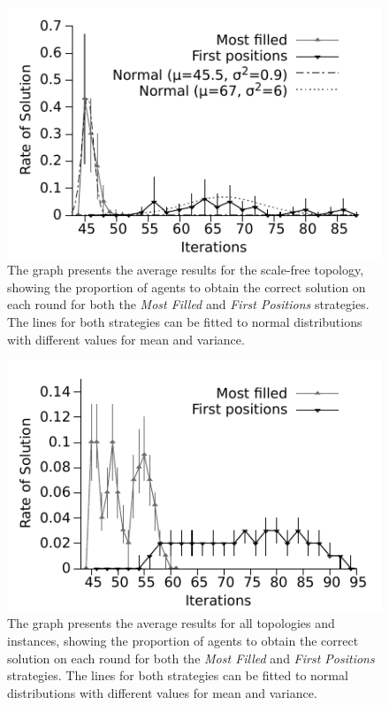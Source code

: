 \documentclass{article}
\begin{document}
\begin{figure}
\includegraphics[scale=1]{ijcai_sudoku/sf}
\caption{The graph presents the average results for the scale-free topology, showing the proportion of agents to obtain the correct solution on each round for both the \emph{Most Filled} and \emph{First Positions} strategies. The lines for both strategies can be fitted to normal distributions with different values for mean and variance.}
\label{fig:sf_gauss}
\end{figure}

\begin{figure}
\includegraphics[scale=1]{ijcai_sudoku/geral}
\caption{The graph presents the average results for all topologies and instances, showing the proportion of agents to obtain the correct solution on each round for both the \emph{Most Filled} and \emph{First Positions} strategies. The lines for both strategies can be fitted to normal distributions with different values for mean and variance.}
\label{fig:global_gauss}
\end{figure}
\end{document}
